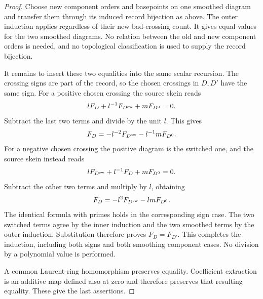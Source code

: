\begin{proof}
Choose new component orders and basepoints on one smoothed diagram and
transfer them through its induced record bijection as above. The outer
induction applies regardless of their new bad-crossing count. It gives
equal values for the two smoothed diagrams. No relation between the old
and new component orders is needed, and no topological classification
is used to supply the record bijection.

It remains to insert these two equalities into the same scalar recursion.
The crossing signs are part of the record, so the chosen crossings in
$D,D'$ have the same sign. For a positive chosen crossing the source
skein reads
\begin{equation}\label{rp:positive-skein}
 lF_D+l^{-1}F_{D^{\rm sw}}+mF_{D^0}=0.
\end{equation}
Subtract the last two terms and divide by the unit $l$. This gives
\begin{equation}\label{rp:positive-recursion}
 F_D=-l^{-2}F_{D^{\rm sw}}-l^{-1}mF_{D^0}.
\end{equation}
For a negative chosen crossing the positive diagram is the switched one,
and the source skein instead reads
\begin{equation}\label{rp:negative-skein}
 lF_{D^{\rm sw}}+l^{-1}F_D+mF_{D^0}=0.
\end{equation}
Subtract the other two terms and multiply by $l$, obtaining
\begin{equation}\label{rp:negative-recursion}
 F_D=-l^2F_{D^{\rm sw}}-lmF_{D^0}.
\end{equation}
The identical formula with primes holds in the corresponding sign case.
The two switched terms agree by the inner induction and the two smoothed
terms by the outer induction. Substitution therefore proves $F_D=F_{D'}$.
This completes the induction, including both signs and both smoothing
component cases. No division by a polynomial value is performed.

A common Laurent-ring homomorphism preserves equality. Coefficient
extraction is an additive map defined also at zero and therefore preserves
that resulting equality. These give the last assertions.
\end{proof}

